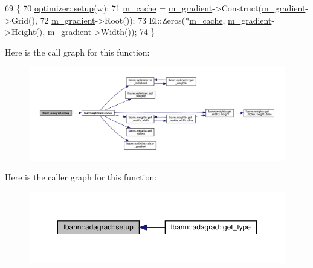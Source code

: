 \begin{DoxyCode}
69                               \{
70   \hyperlink{classlbann_1_1optimizer_a7641a88b3c166df2d974a298622b992b}{optimizer::setup}(w);
71   \hyperlink{classlbann_1_1adagrad_a5eaf0d220d2be78d91455ba85eef3e9a}{m\_cache} = \hyperlink{classlbann_1_1optimizer_a3df20cb0ae2b60430ad4fd235d66c12e}{m\_gradient}->Construct(\hyperlink{classlbann_1_1optimizer_a3df20cb0ae2b60430ad4fd235d66c12e}{m\_gradient}->Grid(),
72                                   \hyperlink{classlbann_1_1optimizer_a3df20cb0ae2b60430ad4fd235d66c12e}{m\_gradient}->Root());
73   El::Zeros(*\hyperlink{classlbann_1_1adagrad_a5eaf0d220d2be78d91455ba85eef3e9a}{m\_cache}, \hyperlink{classlbann_1_1optimizer_a3df20cb0ae2b60430ad4fd235d66c12e}{m\_gradient}->Height(), \hyperlink{classlbann_1_1optimizer_a3df20cb0ae2b60430ad4fd235d66c12e}{m\_gradient}->Width());
74 \}
\end{DoxyCode}
Here is the call graph for this function\+:\nopagebreak
\begin{figure}[H]
\begin{center}
\leavevmode
\includegraphics[width=350pt]{classlbann_1_1adagrad_ab027f2979a6df453eb588b1961afd77a_cgraph}
\end{center}
\end{figure}
Here is the caller graph for this function\+:\nopagebreak
\begin{figure}[H]
\begin{center}
\leavevmode
\includegraphics[width=350pt]{classlbann_1_1adagrad_ab027f2979a6df453eb588b1961afd77a_icgraph}
\end{center}
\end{figure}
\mbox{\label{classlbann_1_1adagrad_a90644f13d0a46e0f52122037f363aaa0}} 
